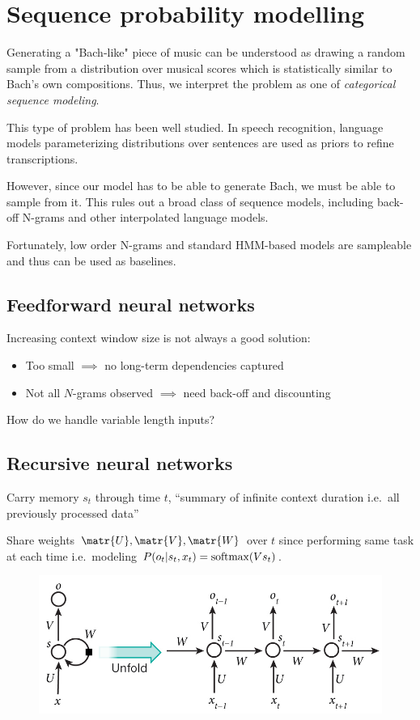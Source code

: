 \documentclass[a4paper,12pt,twoside,openright]{report}
\begin{document}
\chapter{Sequence probability modelling}

Generating a "Bach-like" piece of music can be understood as drawing a random
sample from a distribution over musical scores which is statistically similar
to Bach's own compositions. Thus, we interpret the problem as one of
\emph{categorical sequence modeling}.

This type of problem has been well studied. In speech recognition, language
models parameterizing distributions over sentences are used as priors to refine
transcriptions.

However, since our model has to be able to generate Bach, we must be able to
sample from it. This rules out a broad class of sequence models, including
back-off N-grams and other interpolated language models.

Fortunately, low order N-grams and standard HMM-based models are sampleable and
thus can be used as baselines.

\section{Feedforward neural networks}

Increasing context window size is not always a good solution:
\begin{itemize}
    \item Too small $\implies$ no long-term dependencies captured
    \item Not all $N$-grams observed $\implies$ need back-off and discounting
\end{itemize}

How do we handle variable length inputs?

\section{Recursive neural networks}

Carry memory $s_t$ through time $t$, ``summary of infinite context duration
i.e.\ all previously processed data''

Share weights $\matr{U}, \matr{V}, \matr{W}$ over $t$ since performing same
task at each time i.e.\ modeling $P(o_t | s_t, x_t) = \operatorname*{softmax}(V s_t)$.

\begin{figure}[htpb]
    \centering
    \includegraphics[width=0.8\linewidth]{Figures/rnn.jpg}
    \caption{}
\end{figure}
\end{document}
